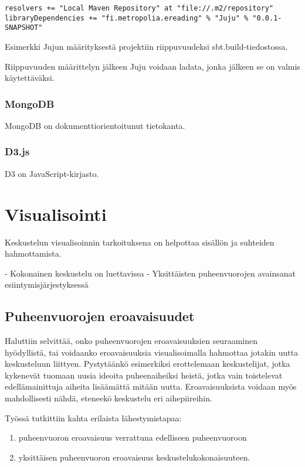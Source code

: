 \documentclass[11pt,a4paper,oneside]{memoir}
\begin{document}
\begin{verbatim}
resolvers += "Local Maven Repository" at "file://.m2/repository"
libraryDependencies += "fi.metropolia.ereading" % "Juju" % "0.0.1-SNAPSHOT"
\end{verbatim}
Esimerkki Jujun määrityksestä projektiin riippuvuudeksi sbt.build-tiedostossa.

Riippuvuuden määrittelyn jälkeen Juju voidaan ladata, jonka jälkeen se on valmis käytettäväksi.

\subsection{MongoDB}
MongoDB on dokumenttiorientoitunut tietokanta. 

\subsection{D3.js}
D3 on JavaScript-kirjasto.

\chapter{Visualisointi}
Keskustelun visualisoinnin tarkoituksena on helpottaa sisällön ja suhteiden hahmottamista.

- Kokonainen keskustelu on luettavissa
- Yksittäisten puheenvuorojen avainsanat esiintymisjärjestyksessä

\section{Puheenvuorojen eroavaisuudet}
Haluttiin selvittää, onko puheenvuorojen eroavaisuuksien seuraaminen hyödyllistä, tai voidaanko eroavaisuuksia visualisoimalla hahmottaa jotakin uutta keskusteluun liittyen. Pystytäänkö esimerkiksi erottelemaan keskustelijat, jotka kykenevät tuomaan uusia ideoita puheenaiheiksi heistä, jotka vain toistelevat edellämainittuja aiheita lisäämättä mitään uutta. Eroavaisuuksista voidaan myös mahdollisesti nähdä, eteneekö keskustelu eri aihepiireihin.

Työssä tutkittiin kahta erilaista lähestymistapaa:
\begin{enumerate}
\item puheenvuoron eroavaisuus verrattuna edelliseen puheenvuoroon
\item yksittäisen puheenvuoron eroavaisuus keskustelukokonaisuuteen.
\end{enumerate}
\end{document}
